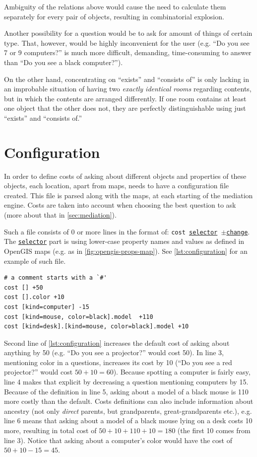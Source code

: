 Ambiguity of the relations above would cause the need to calculate them separately for every pair of objects, resulting in combinatorial explosion.

Another possibility for a question would be to ask for amount of things of certain type. That, however, would be highly inconvenient for the user (e.g. ``Do you see 7 or 9 computers?'' is much more difficult, demanding, time-consuming to answer than ``Do you see a black computer?'').

On the other hand, concentrating on ``exists'' and ``consists of'' is only lacking in an improbable situation of having two \emph{exactly identical rooms} regarding contents, but in which the contents are arranged differently. If one room contains at least one object that the other does not, they are perfectly distinguishable using just ``exists'' and ``consists of.''

\section{Configuration}
\label{sec:configuration}

In order to define costs of asking about different objects and properties of these objects, each location, apart from maps, needs to have a configuration file created. This file is parsed along with the maps, at each starting of the mediation engine. Costs are taken into account when choosing the best question to ask (more about that in \cref{sec:mediation}).

Such a file consists of 0 or more lines in the format of: \texttt{cost \underline{selector} $\pm$\underline{change}}. The \texttt{\underline{selector}} part is using lower-case property names and values as defined in OpenGIS maps (e.g. as in \cref{fig:opengis-props-map}). See \cref{lst:configuration} for an example of such file.

\begin{lstlisting}[caption={Definition of costs in a sample configuration file.},label=lst:configuration]
# a comment starts with a `#'
cost [] +50
cost [].color +10
cost [kind=computer] -15
cost [kind=mouse, color=black].model  +110
cost [kind=desk].[kind=mouse, color=black].model +10
\end{lstlisting}

Second line of \cref{lst:configuration} increases the default cost of asking about anything by 50 (e.g. ``Do you see a projector?'' would cost 50). In line 3, mentioning color in a questions, increases its cost by 10 (``Do you see a red projector?'' would cost $50+10=60$). Because spotting a computer is fairly easy, line 4 makes that explicit by decreasing a question mentioning computers by 15. Because of the definition in line 5, asking about a model of a black mouse is 110 more costly than the default. Costs definitions can also include information about ancestry (not only \emph{direct} parents, but grandparents, great-grandparents etc.), e.g. line 6 means that asking about a model of a black mouse lying on a desk costs 10 more, resulting in total cost of $50+10+110+10=180$ (the first 10 comes from line 3). Notice that asking about a computer's color would have the cost of $50+10-15=45$.

